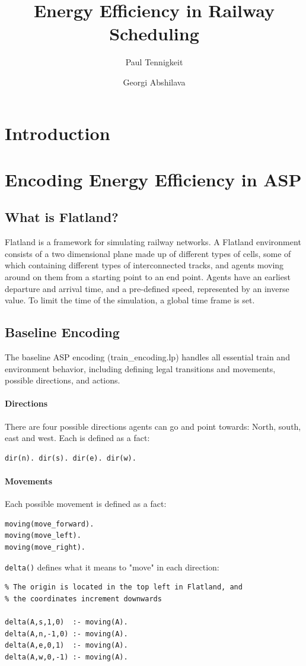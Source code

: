\documentclass[12pt, a4paper]{llncs}
\title{Energy Efficiency in Railway Scheduling}
\author{Paul Tennigkeit \and Georgi Abshilava}
\institute{University of Potsdam, Germany \\
\email{\{tennigkeit, abshilava\}@uni-potsdam.de}}
\begin{document}
\maketitle

\section{Introduction}
\section{Encoding Energy Efficiency in ASP}
\subsection{What is Flatland?}
Flatland is a framework for simulating railway networks. A Flatland environment consists of a two dimensional plane made up of different types of cells, some of which containing different types of interconnected tracks, and agents moving around on them from a starting point to an end point. Agents have an earliest departure and arrival time, and a pre-defined speed, represented by an inverse value. To limit the time of the simulation, a global time frame is set.

\subsection{Baseline Encoding}
The baseline ASP encoding (train\_encoding.lp) handles all essential train and environment behavior, including defining legal transitions and movements, possible directions, and actions.

\paragraph{Directions}
There are four possible directions agents can go and point towards: North, south, east and west. Each is defined as a fact:
\begin{verbatim}
dir(n). dir(s). dir(e). dir(w).
\end{verbatim}

\paragraph{Movements}
Each possible movement is defined as a fact:
\begin{verbatim}
moving(move_forward).
moving(move_left).
moving(move_right).
\end{verbatim}
\texttt{delta()} defines what it means to "move" in each direction:
\begin{verbatim}
% The origin is located in the top left in Flatland, and 
% the coordinates increment downwards

delta(A,s,1,0)  :- moving(A).
delta(A,n,-1,0) :- moving(A).
delta(A,e,0,1)  :- moving(A).
delta(A,w,0,-1) :- moving(A).
\end{verbatim}
\end{document}
